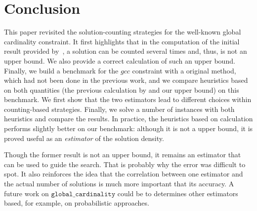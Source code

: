 \documentclass[jair,twoside,11pt,theapa]{article}
\begin{document}

\section{Conclusion}
This paper revisited the solution-counting strategies for the well-known global cardinality constraint. It first highlights that in the computation of the initial result provided by~\cite{PesantQZ12}, a solution can be counted several times and, thus, is not an upper bound. We also provide a correct calculation of such an upper bound. Finally, we build a benchmark for the $gcc$ constraint with a original method, which had not been done in the previous work, and we compare heuristics based on both quantities (the previous calculation by \cite{PesantQZ12} and our upper bound) on this benchmark. We first show that the two estimators lead to different choices within counting-based strategies. Finally, we solve a number of instances with both heuristics and compare the results. In practice, the heuristics based on \cite{PesantQZ12} calculation performs slightly better on our benchmark: although it is not a upper bound, it is proved useful as an \textit{estimator} of the solution density.

 Though the former result is not an upper bound, it remains an estimator that can be used to guide the search. That is probably why the error was difficult to spot. It also reinforces the idea that the correlation between one estimator and the actual number of solutions is much more important that its accuracy. A future work on $\texttt{global\_cardinality}$ could be to determines other estimators based, for example, on probabilistic approaches.
 
 
 
 
\end{document}
